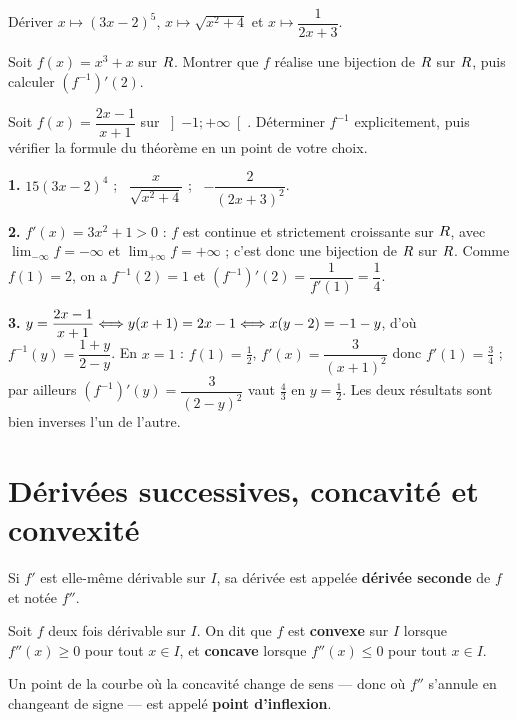 \begin{entrainement}
\exo[\niveau{1}] Dériver $x \mapsto (3x-2)^{5}$, $x \mapsto \sqrt{x^{2}+4}$ et
$x \mapsto \dfrac{1}{2x+3}$.

\exo[\niveau{2}] Soit $f(x) = x^{3}+x$ sur $R$. Montrer que $f$ réalise une
bijection de $R$ sur $R$, puis calculer $\left(f^{-1}\right)'(2)$.

\exo[\niveau{3}] Soit $f(x) = \dfrac{2x-1}{x+1}$ sur $\left]-1 ; +\infty\right[$.
Déterminer $f^{-1}$ explicitement, puis vérifier la formule du théorème en
un point de votre choix.
\end{entrainement}

\begin{corrige}
\textbf{1.} $15(3x-2)^{4}$ ; \ $\dfrac{x}{\sqrt{x^{2}+4}}$ ; \
$-\dfrac{2}{(2x+3)^{2}}$.

\textbf{2.} $f'(x) = 3x^{2}+1 > 0$ : $f$ est continue et strictement
croissante sur $R$, avec $\lim_{-\infty} f = -\infty$ et
$\lim_{+\infty} f = +\infty$ ; c'est donc une bijection de $R$ sur $R$.
Comme $f(1) = 2$, on a $f^{-1}(2) = 1$ et
$\left(f^{-1}\right)'(2) = \dfrac{1}{f'(1)} = \dfrac{1}{4}$.

\textbf{3.} $y = \dfrac{2x-1}{x+1} \Longleftrightarrow y(x+1) = 2x-1 \Longleftrightarrow x(y-2) = -1-y$,
d'où $f^{-1}(y) = \dfrac{1+y}{2-y}$. En $x = 1$ : $f(1) = \tfrac{1}{2}$,
$f'(x) = \dfrac{3}{(x+1)^{2}}$ donc $f'(1) = \tfrac{3}{4}$ ; par ailleurs
$\left(f^{-1}\right)'(y) = \dfrac{3}{(2-y)^{2}}$ vaut $\tfrac{4}{3}$ en
$y = \tfrac{1}{2}$. Les deux résultats sont bien inverses l'un de l'autre.
\end{corrige}

\section{Dérivées successives, concavité et convexité}

\begin{definition}
Si $f'$ est elle-même dérivable sur $I$, sa dérivée est appelée
\textbf{dérivée seconde} de $f$ et notée $f''$.
\end{definition}

\begin{definition}
Soit $f$ deux fois dérivable sur $I$. On dit que $f$ est \textbf{convexe} sur
$I$ lorsque $f''(x) \geq 0$ pour tout $x \in I$, et \textbf{concave} lorsque
$f''(x) \leq 0$ pour tout $x \in I$.

Un point de la courbe où la concavité change de sens — donc où $f''$ s'annule
en changeant de signe — est appelé \textbf{point d'inflexion}.
\end{definition}

